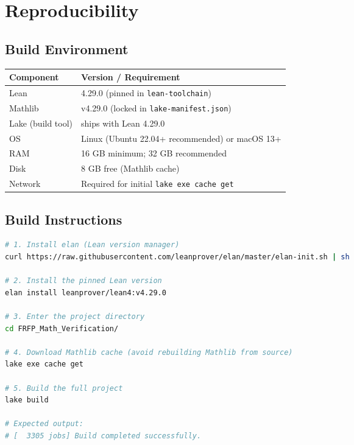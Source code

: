 \section{Reproducibility}
\label{ch:repro}

\subsection{Build Environment}

\begin{center}
\begin{tabular}{ll}
\toprule
Component & Version / Requirement \\
\midrule
Lean & 4.29.0 (pinned in \texttt{lean-toolchain}) \\
Mathlib & v4.29.0 (locked in \texttt{lake-manifest.json}) \\
Lake (build tool) & ships with Lean 4.29.0 \\
OS & Linux (Ubuntu 22.04+ recommended) or macOS 13+ \\
RAM & 16 GB minimum; 32 GB recommended \\
Disk & 8 GB free (Mathlib cache) \\
Network & Required for initial \texttt{lake exe cache get} \\
\bottomrule
\end{tabular}
\end{center}

\subsection{Build Instructions}

\begin{lstlisting}[language=bash]
# 1. Install elan (Lean version manager)
curl https://raw.githubusercontent.com/leanprover/elan/master/elan-init.sh | sh

# 2. Install the pinned Lean version
elan install leanprover/lean4:v4.29.0

# 3. Enter the project directory
cd FRFP_Math_Verification/

# 4. Download Mathlib cache (avoid rebuilding Mathlib from source)
lake exe cache get

# 5. Build the full project
lake build

# Expected output:
# [  3305 jobs] Build completed successfully.
\end{lstlisting}

